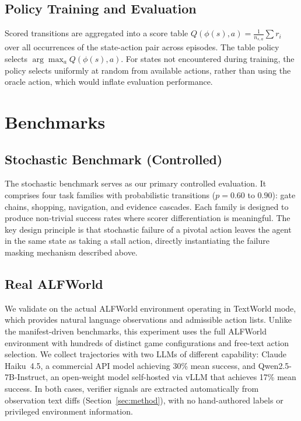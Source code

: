 \documentclass[11pt]{article}
\begin{document}
\subsection{Policy Training and Evaluation}

Scored transitions are aggregated into a score table $Q(\phi(s), a) = \frac{1}{n_{s,a}} \sum r_i$ over all occurrences of the state-action pair across episodes. The table policy selects $\arg\max_{a} Q(\phi(s), a)$. For states not encountered during training, the policy selects uniformly at random from available actions, rather than using the oracle action, which would inflate evaluation performance.

\section{Benchmarks}

\subsection{Stochastic Benchmark (Controlled)}
The stochastic benchmark serves as our primary controlled evaluation. It comprises four task families with probabilistic transitions ($p = 0.60$ to $0.90$): gate chains, shopping, navigation, and evidence cascades. Each family is designed to produce non-trivial success rates where scorer differentiation is meaningful. The key design principle is that stochastic failure of a pivotal action leaves the agent in the same state as taking a stall action, directly instantiating the failure masking mechanism described above.

\subsection{Real ALFWorld}
We validate on the actual ALFWorld environment \citep{shridhar2021alfworld} operating in TextWorld mode, which provides natural language observations and admissible action lists. Unlike the manifest-driven benchmarks, this experiment uses the full ALFWorld environment with hundreds of distinct game configurations and free-text action selection. We collect trajectories with two LLMs of different capability: Claude Haiku~4.5, a commercial API model achieving 30\% mean success, and Qwen2.5-7B-Instruct, an open-weight model self-hosted via vLLM that achieves 17\% mean success. In both cases, verifier signals are extracted automatically from observation text diffs (Section~\ref{sec:method}), with no hand-authored labels or privileged environment information.
\end{document}
